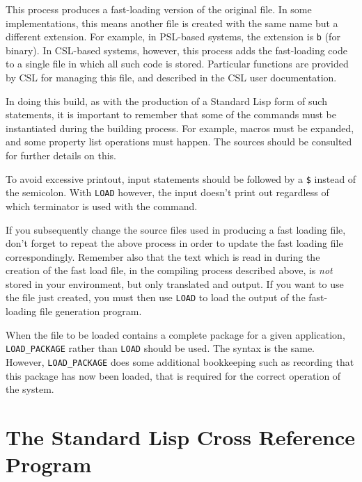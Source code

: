 This process produces a fast-loading version of the original file.  In some
implementations, this means another file is created with the same name but
a different extension. For example, in PSL-based systems, the extension is
\texttt{b} (for binary). In CSL-based systems, however, this process adds the
fast-loading code to a single file in which all such code is stored. 
Particular functions are provided by CSL for managing this file, and 
described in the CSL user documentation.

In doing this build, as with the production of a Standard Lisp form of
such statements, it is important to remember that some of the commands
must be instantiated during the building process.  For example, macros
must be expanded, and some property list operations must happen.
The {\REDUCE} sources should be consulted for further details on this.

To avoid excessive printout, input statements should be followed by a \texttt{\$}
instead of the semicolon.  With \texttt{LOAD} however, the input doesn't
print out regardless of which terminator is used with the command.

If you subsequently change the source files used in producing a fast
loading file, don't forget to repeat the above process in order to update
the fast loading file correspondingly.  Remember also that the text which
is read in during the creation of the fast load file, in the compiling
process described above, is \emph{not} stored in your {\REDUCE}
environment, but only translated and output.  If you want to use the file
just created, you must then use \texttt{LOAD} to load the output of the
fast-loading file generation program.

When the file to be loaded contains a complete package for a given
application, \texttt{LOAD\_PACKAGE} rather than
\texttt{LOAD} should be used.  The syntax is the same.  However,
\texttt{LOAD\_PACKAGE} does some additional bookkeeping such as recording that
this package has now been loaded, that is required for the correct
operation of the system.

\section{The Standard Lisp Cross Reference Program}
\hypertarget{switch:CREF}{}

